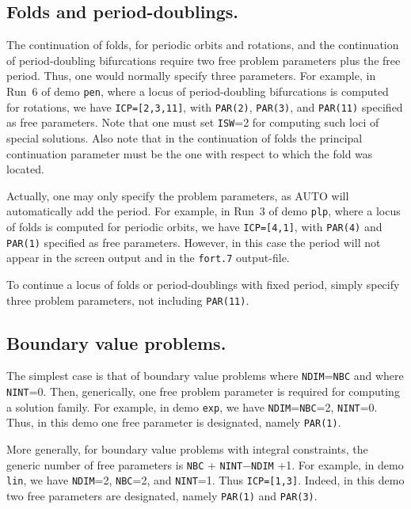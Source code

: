 \documentclass[12pt]{report}
\begin{document}
\subsection{ Folds and period-doublings.}
The continuation of folds, for periodic orbits and rotations,
and the continuation of period-doubling bifurcations require two free 
problem parameters plus the free period. Thus, one would normally
specify three parameters.
For example, in Run~6 of demo {\tt pen}, where a locus of period-doubling
bifurcations is computed for rotations, we have {\tt ICP=[2,3,11]}, 
with {\tt PAR(2)}, {\tt PAR(3)}, and {\tt PAR(11)} specified as free parameters. 
Note that one must set {\tt ISW}=2 for computing such loci of special solutions.
Also note that in the continuation of folds the principal continuation parameter
must be the one with respect to which the fold was located.

Actually, one may only specify the problem parameters,
as {\cal AUTO} will automatically add the period.
For example, in Run~3 of demo {\tt plp}, where a locus of folds is computed 
for periodic orbits, we have {\tt ICP=[4,1]}, with {\tt PAR(4)} and {\tt PAR(1)} specified
as free parameters. 
However, in this case the period will not appear in the screen output 
and in the {\tt fort.7} output-file. 

To continue a locus of folds or period-doublings with fixed period, simply
specify three problem parameters, not including {\tt PAR(11)}.

\subsection{ Boundary value problems.}
The simplest case is that of boundary value problems where 
{\tt NDIM}={\tt NBC} 
and where {\tt NINT}=0.
Then, generically, one free problem parameter is required for computing 
a solution family.
For example, in demo {\tt exp}, we have {\tt NDIM}={\tt NBC}=2, {\tt NINT}=0. 
Thus, in this demo one free parameter is designated,
namely {\tt PAR(1)}.

More generally, for boundary value problems with integral constraints,
the generic number of free parameters is {\tt NBC} + {\tt NINT}$-${\tt NDIM} +1.
For example, in demo {\tt lin}, we have {\tt NDIM}=2, {\tt NBC}=2, and {\tt NINT}=1.
Thus {\tt ICP=[1,3]}. 
Indeed, in this demo two free parameters are designated,
namely {\tt PAR(1)} and {\tt PAR(3)}.
\end{document}
